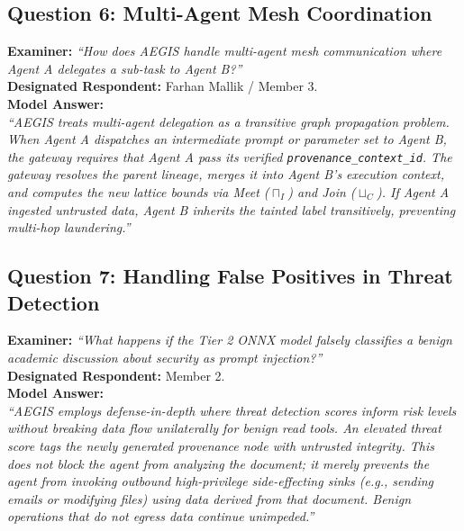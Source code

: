 \subsection{Question 6: Multi-Agent Mesh Coordination}
\textbf{Examiner:} \textit{``How does AEGIS handle multi-agent mesh communication where Agent A delegates a sub-task to Agent B?''} \\
\textbf{Designated Respondent:} Farhan Mallik / Member 3. \\
\textbf{Model Answer:} \\
\textit{``AEGIS treats multi-agent delegation as a transitive graph propagation problem. When Agent A dispatches an intermediate prompt or parameter set to Agent B, the gateway requires that Agent A pass its verified \texttt{provenance\_context\_id}. The gateway resolves the parent lineage, merges it into Agent B's execution context, and computes the new lattice bounds via Meet ($\sqcap_I$) and Join ($\sqcup_C$). If Agent A ingested untrusted data, Agent B inherits the tainted label transitively, preventing multi-hop laundering.''}

\subsection{Question 7: Handling False Positives in Threat Detection}
\textbf{Examiner:} \textit{``What happens if the Tier 2 ONNX model falsely classifies a benign academic discussion about security as prompt injection?''} \\
\textbf{Designated Respondent:} Member 2. \\
\textbf{Model Answer:} \\
\textit{``AEGIS employs defense-in-depth where threat detection scores inform risk levels without breaking data flow unilaterally for benign read tools. An elevated threat score tags the newly generated provenance node with untrusted integrity. This does not block the agent from analyzing the document; it merely prevents the agent from invoking outbound high-privilege side-effecting sinks (e.g., sending emails or modifying files) using data derived from that document. Benign operations that do not egress data continue unimpeded.''}


